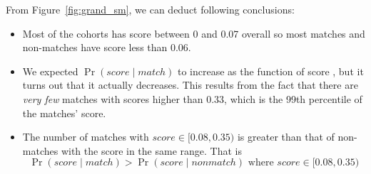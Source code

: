 From Figure~\ref{fig:grand_sm}, we can deduct following conclusions:
\begin{itemize}
\item Most of the cohorts has score between 0 and 0.07 overall so most matches
and non-matches have score less than 0.06.
\item We expected $\Pr{(score \mid match)}$ to increase as the function of score
, but it turns out that it actually decreases. This results from the fact that
there are \emph{very few} matches with scores higher than 0.33, which is the 99th
percentile of the matches' score.
\item The number of matches with $score \in [0.08, 0.35)$ is greater than that of
non-matches with the score in the same range. That is
$$\Pr{(score \mid match)} > \Pr{(score \mid nonmatch)} \mbox{ where } score\in [0.08, 0.35)$$
\end{itemize}

